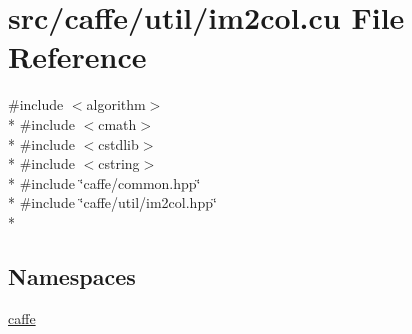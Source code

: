 \hypertarget{im2col_8cu}{\section{src/caffe/util/im2col.cu File Reference}
\label{im2col_8cu}
}
{\ttfamily \#include $<$algorithm$>$}\\*
{\ttfamily \#include $<$cmath$>$}\\*
{\ttfamily \#include $<$cstdlib$>$}\\*
{\ttfamily \#include $<$cstring$>$}\\*
{\ttfamily \#include \char`\"{}caffe/common.\+hpp\char`\"{}}\\*
{\ttfamily \#include \char`\"{}caffe/util/im2col.\+hpp\char`\"{}}\\*
\subsection*{Namespaces}
\begin{DoxyCompactItemize}
\item 
 \hyperlink{namespacecaffe}{caffe}
\end{DoxyCompactItemize}
